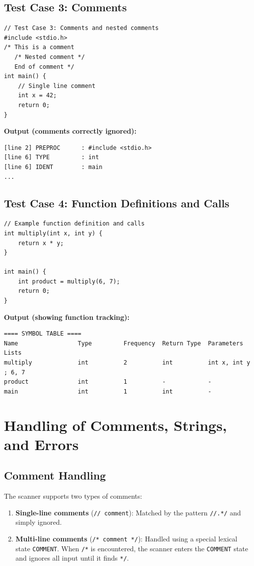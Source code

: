 \documentclass[12pt]{article}
\begin{document}
\subsection{Test Case 3: Comments}

\begin{verbatim}
// Test Case 3: Comments and nested comments
#include <stdio.h>
/* This is a comment
   /* Nested comment */
   End of comment */
int main() {
    // Single line comment
    int x = 42;
    return 0;
}
\end{verbatim}

\noindent
\textbf{Output (comments correctly ignored):}
\begin{verbatim}
[line 2] PREPROC      : #include <stdio.h>
[line 6] TYPE         : int
[line 6] IDENT        : main
...
\end{verbatim}

\subsection{Test Case 4: Function Definitions and Calls}

\begin{verbatim}
// Example function definition and calls
int multiply(int x, int y) {
    return x * y;
}

int main() {
    int product = multiply(6, 7);
    return 0;
}
\end{verbatim}

\noindent
\textbf{Output (showing function tracking):}
\begin{verbatim}
==== SYMBOL TABLE ====
Name                 Type         Frequency  Return Type  Parameters Lists
multiply             int          2          int          int x, int y ; 6, 7
product              int          1          -            -
main                 int          1          int          -
\end{verbatim}

\section{Handling of Comments, Strings, and Errors}

\subsection{Comment Handling}

The scanner supports two types of comments:
\begin{enumerate}
    \item \textbf{Single-line comments} (\texttt{// comment}): Matched by the pattern \texttt{//.*/} and simply ignored.
    \item \textbf{Multi-line comments} (\texttt{/* comment */}): Handled using a special lexical state \texttt{COMMENT}. When \texttt{/*} is encountered, the scanner enters the \texttt{COMMENT} state and ignores all input until it finds \texttt{*/}.
\end{enumerate}
\end{document}
